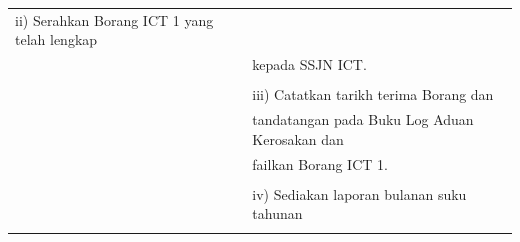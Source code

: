 \documentclass[
]{article}
\begin{document}
\begin{longtable}[]{@{}ll@{}}
\begin{minipage}[t]{0.71\columnwidth}
ii) Serahkan Borang ICT 1 yang telah lengkap\strut
\end{minipage}\tabularnewline
\begin{minipage}[t]{0.23\columnwidth}\raggedright
\strut
\end{minipage} & \begin{minipage}[t]{0.71\columnwidth}\raggedright
kepada SSJN ICT.\strut
\end{minipage}\tabularnewline
\begin{minipage}[t]{0.23\columnwidth}\raggedright
\strut
\end{minipage} & \begin{minipage}[t]{0.71\columnwidth}\raggedright
\strut
\end{minipage}\tabularnewline
\begin{minipage}[t]{0.23\columnwidth}\raggedright
\strut
\end{minipage} & \begin{minipage}[t]{0.71\columnwidth}\raggedright
iii) Catatkan tarikh terima Borang dan\strut
\end{minipage}\tabularnewline
\begin{minipage}[t]{0.23\columnwidth}\raggedright
\strut
\end{minipage} & \begin{minipage}[t]{0.71\columnwidth}\raggedright
tandatangan pada Buku Log Aduan Kerosakan dan\strut
\end{minipage}\tabularnewline
\begin{minipage}[t]{0.23\columnwidth}\raggedright
\strut
\end{minipage} & \begin{minipage}[t]{0.71\columnwidth}\raggedright
failkan Borang ICT 1.\strut
\end{minipage}\tabularnewline
\begin{minipage}[t]{0.23\columnwidth}\raggedright
\strut
\end{minipage} & \begin{minipage}[t]{0.71\columnwidth}\raggedright
\strut
\end{minipage}\tabularnewline
\begin{minipage}[t]{0.23\columnwidth}\raggedright
\strut
\end{minipage} & \begin{minipage}[t]{0.71\columnwidth}\raggedright
iv) Sediakan laporan bulanan suku tahunan\strut
\end{minipage}\tabularnewline
\begin{minipage}[t]{0.23\columnwidth}\raggedright

\end{minipage}
\end{longtable}
\end{document}
